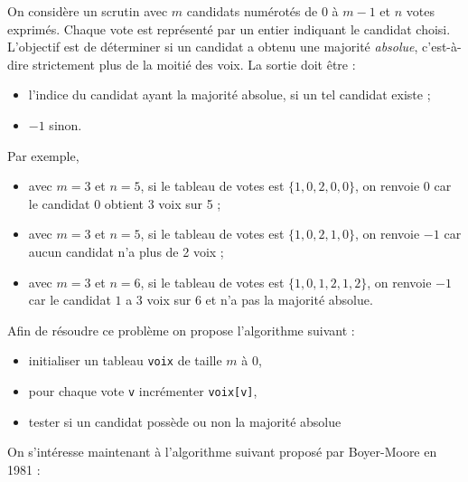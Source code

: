 \documentclass[11pt,a4paper]{article}
\begin{document}
\begin{Exercise*}[title = type A]
 
On considère un scrutin avec $m$ candidats numérotés de $0$ à $m-1$ et $n$ votes exprimés. Chaque vote est représenté par un entier indiquant le candidat choisi. 
L'objectif est de déterminer si un candidat a obtenu une majorité \textit{absolue}, c'est-à-dire strictement plus de la moitié des voix. La sortie doit être :
\begin{itemize}
    \item l'indice du candidat ayant la majorité absolue, si un tel candidat existe ;
    \item $-1$ sinon.
\end{itemize}

Par exemple,
\begin{itemize}
    \item avec $m=3$ et $n=5$, si le tableau de votes est $\{1, 0, 2, 0, 0\}$, on renvoie $0$ car le candidat $0$ obtient 3 voix sur 5 ;
    \item avec $m=3$ et $n=5$, si le tableau de votes est $\{1, 0, 2, 1, 0\}$, on renvoie $-1$ car aucun candidat n'a plus de 2 voix ;
    \item avec $m=3$ et $n=6$, si le tableau de votes est $\{1, 0, 1, 2, 1, 2\}$, on renvoie $-1$ car le candidat $1$ a 3 voix sur 6 et n'a pas la majorité absolue.
\end{itemize}

Afin de résoudre ce problème on propose l'algorithme suivant :
\begin{itemize}
 \item initialiser un tableau {\tt voix} de taille $m$ à 0,
 \item pour chaque vote {\tt v} incrémenter {\tt voix[v]},
 \item tester si un candidat possède ou non la majorité absolue
\end{itemize}


\medskip{}\NRet
On s'intéresse maintenant à l'algorithme suivant proposé par Boyer-Moore en  1981 :


\end{Exercise*}
\end{document}
